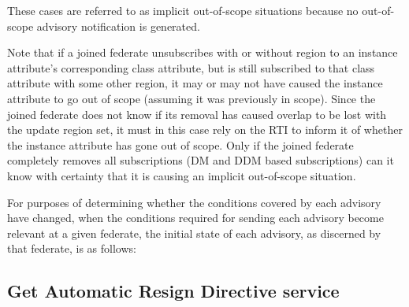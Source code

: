 \begin{compactstdpage}

    These cases are referred to as implicit out-of-scope situations because no out-of-scope advisory notification is generated.

    Note that if a joined federate unsubscribes with or without region to an instance attribute's corresponding class attribute, but is still subscribed to that class attribute with some other region, it may or may not have caused the instance attribute to go out of scope (assuming it was previously in scope). Since the joined federate does not know if its removal has caused overlap to be lost with the update region set, it must in this case rely on the RTI to inform it of whether the instance attribute has gone out of scope. Only if the joined federate completely removes all subscriptions (DM and DDM based subscriptions) can it know with certainty that it is causing an implicit out-of-scope situation.

    For purposes of determining whether the conditions covered by each advisory have changed, when the conditions required for sending each advisory become relevant at a given federate, the initial state of each advisory, as discerned by that federate, is as follows:


    \subsection{Get Automatic Resign Directive service}


\end{compactstdpage}
